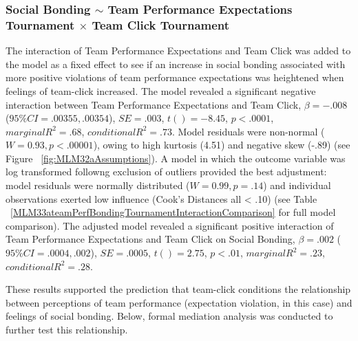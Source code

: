 \documentclass[12pt]{report}
\begin{document}
{\subsubsection{Social Bonding $\sim$ Team Performance Expectations Tournament $\times$ Team Click Tournament}

The interaction of Team Performance Expectations and Team Click was added to the model as a fixed effect to see if an increase in social bonding associated with more positive violations of team performance expectations was heightened when feelings of team-click increased. The model revealed a significant negative interaction between Team Performance Expectations and Team Click,  $\beta = -.008$ ($95\% CI =  .00355, .00354$), $SE = .003$, $t() = -8.45$, $p < .0001$, $marginal R^2 = .68$, $conditional R^2 = .73$.  Model residuals were non-normal ($W = 0.93, p < .00001$), owing to high kurtosis (4.51) and negative skew (-.89) (see Figure ~\ref{fig:MLM32aAssumptions}). A model in which the outcome variable was log transformed followng exclusion of outliers provided the best adjustment: model residuals were normally distributed ($W = 0.99, p = .14$) and individual observations exerted low influence (Cook's Distances all < .10) (see Table ~\ref{MLM33ateamPerfBondingTournamentInteractionComparison} for full model comparison). The adjusted model revealed a significant positive interaction of Team Performance Expectations and Team Click on Social Bonding, $\beta = .002$ ($95\% CI =  .0004, .002$), $SE = .0005$, $t() = 2.75$, $p < .01$, $marginal R^2 = .23$, $conditional R^2 = .28$.

These results supported the prediction that team-click conditions the relationship between perceptions of team performance (expectation violation, in this case) and feelings of social bonding.  Below, formal mediation analysis was conducted to further test this relationship.





}
\end{document}
